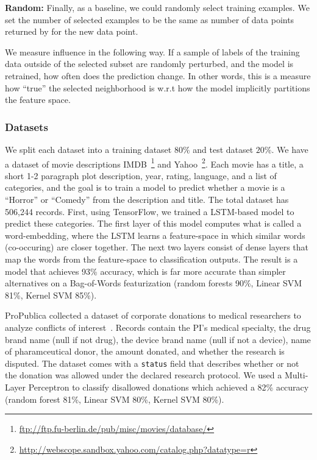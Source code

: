 \vspace{0.25em} \noindent \textbf{Random: } Finally, as a baseline, we could randomly select training examples.  We set the number of selected examples to be the same as number of data points returned by \sys for the new data point.

\noindent \vspace{0.5em} We measure influence in the following way.
If a sample of labels of the training data outside of the selected subset are randomly perturbed, and the model is retrained, how often does the prediction change. In other words, this is a measure how ``true'' the selected neighborhood is w.r.t how the model implicitly partitions the feature space.

\subsubsection{Datasets}
We split each dataset into a training dataset $80\%$ and test dataset $20\%$. 
 We have a dataset of movie descriptions IMDB~\footnote{ \url{ftp://ftp.fu-berlin.de/pub/misc/movies/database/}} and Yahoo~\footnote{ \url{http://webscope.sandbox.yahoo.com/catalog.php?datatype=r}}.
Each movie has a title, a short 1-2 paragraph plot description, year, rating, language, and a list of categories, and the goal is to train a model to predict whether a movie is a ``Horror'' or ``Comedy'' from the description and title.  
The total dataset has 506,244 records.
First, using TensorFlow, we trained a LSTM-based model to predict these categories. The first layer of this model computes what is called a word-embedding, where the LSTM learns a feature-space in which similar words (co-occuring) are closer together. 
The next two layers consist of dense layers that map the words from the feature-space to classification outputs.
The result is a model that achieves 93\% accuracy, which is far more accurate than simpler alternatives on a Bag-of-Words featurization (random forests 90\%, Linear SVM 81\%, Kernel SVM 85\%).

 ProPublica collected a dataset of corporate donations to medical researchers to analyze conflicts of interest~\cite{dollarsfordocs}. 
Records contain the PI's medical specialty, the drug brand name (null if not drug), the device brand name (null if not a device), name of pharamceutical donor, the amount donated, and whether the research is disputed.
The dataset comes with a \texttt{status} field that describes whether or not the donation was allowed under the declared research protocol.
We used a Multi-Layer Perceptron to classify disallowed donations which achieved a 82\% accuracy (random forest 81\%, Linear SVM 80\%, Kernel SVM 80\%).

